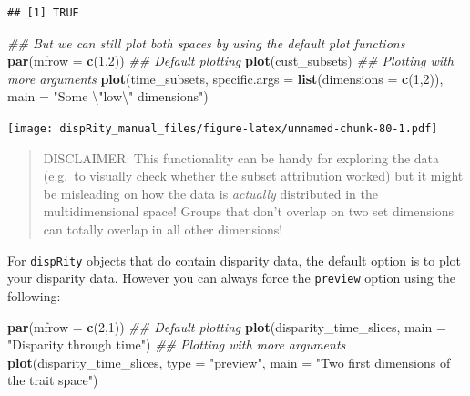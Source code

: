 \documentclass[]{book}
\newenvironment{Shaded}{\begin{snugshade}}{\end{snugshade}}
\newcommand{\CharTok}[1]{\textcolor[rgb]{0.31,0.60,0.02}{#1}}
\newcommand{\CommentTok}[1]{\textcolor[rgb]{0.56,0.35,0.01}{\textit{#1}}}
\newcommand{\DataTypeTok}[1]{\textcolor[rgb]{0.13,0.29,0.53}{#1}}
\newcommand{\DecValTok}[1]{\textcolor[rgb]{0.00,0.00,0.81}{#1}}
\newcommand{\KeywordTok}[1]{\textcolor[rgb]{0.13,0.29,0.53}{\textbf{#1}}}
\newcommand{\NormalTok}[1]{#1}
\newcommand{\StringTok}[1]{\textcolor[rgb]{0.31,0.60,0.02}{#1}}
\begin{document}
\begin{verbatim}
## [1] TRUE
\end{verbatim}

\begin{Shaded}
\begin{Highlighting}[]
\CommentTok{## But we can still plot both spaces by using the default plot functions}
\KeywordTok{par}\NormalTok{(}\DataTypeTok{mfrow =} \KeywordTok{c}\NormalTok{(}\DecValTok{1}\NormalTok{,}\DecValTok{2}\NormalTok{))}
\CommentTok{## Default plotting}
\KeywordTok{plot}\NormalTok{(cust_subsets)}
\CommentTok{## Plotting with more arguments}
\KeywordTok{plot}\NormalTok{(time_subsets, }\DataTypeTok{specific.args =} \KeywordTok{list}\NormalTok{(}\DataTypeTok{dimensions =} \KeywordTok{c}\NormalTok{(}\DecValTok{1}\NormalTok{,}\DecValTok{2}\NormalTok{)),}
     \DataTypeTok{main =} \StringTok{"Some }\CharTok{\textbackslash{}"}\StringTok{low}\CharTok{\textbackslash{}"}\StringTok{ dimensions"}\NormalTok{)}
\end{Highlighting}
\end{Shaded}

\texttt{[image: dispRity\_manual\_files/figure-latex/unnamed-chunk-80-1.pdf]}

\begin{quote}
DISCLAIMER: This functionality can be handy for exploring the data (e.g.~to visually check whether the subset attribution worked) but it might be misleading on how the data is \emph{actually} distributed in the multidimensional space!
Groups that don't overlap on two set dimensions can totally overlap in all other dimensions!
\end{quote}

For \texttt{dispRity} objects that do contain disparity data, the default option is to plot your disparity data.
However you can always force the \texttt{preview} option using the following:

\begin{Shaded}
\begin{Highlighting}[]
\KeywordTok{par}\NormalTok{(}\DataTypeTok{mfrow =} \KeywordTok{c}\NormalTok{(}\DecValTok{2}\NormalTok{,}\DecValTok{1}\NormalTok{))}
\CommentTok{## Default plotting}
\KeywordTok{plot}\NormalTok{(disparity_time_slices, }\DataTypeTok{main =} \StringTok{"Disparity through time"}\NormalTok{)}
\CommentTok{## Plotting with more arguments}
\KeywordTok{plot}\NormalTok{(disparity_time_slices, }\DataTypeTok{type =} \StringTok{"preview"}\NormalTok{,}
     \DataTypeTok{main =} \StringTok{"Two first dimensions of the trait space"}\NormalTok{)}
\end{Highlighting}
\end{Shaded}
\end{document}
